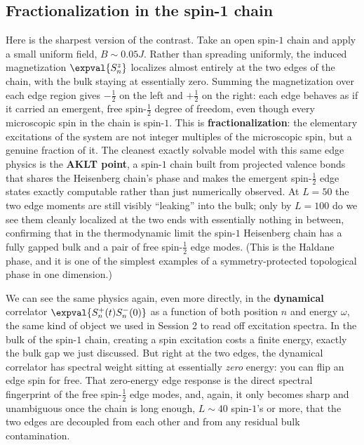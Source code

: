 \documentclass[all_sessions.tex]{subfiles}
\begin{document}
\subsection{Fractionalization in the spin-1 chain}
Here is the sharpest version of the contrast. Take an open spin-$1$ chain and apply a small
uniform field, $B\sim0.05J$. Rather than spreading uniformly, the induced magnetization
$\expval{S_n^z}$ localizes almost entirely at the two edges of the chain, with the bulk staying at
essentially zero. Summing the magnetization over each edge region gives $-\tfrac12$ on the left and
$+\tfrac12$ on the right: each edge behaves as if it carried an emergent, free spin-$\tfrac12$
degree of freedom, even though every microscopic spin in the chain is spin-$1$. This is
\textbf{fractionalization}: the elementary excitations of the system are not integer multiples of
the microscopic spin, but a genuine fraction of it. The cleanest exactly solvable model with this
same edge physics is the \textbf{AKLT point}, a spin-$1$ chain built from projected valence bonds
that shares the Heisenberg chain's phase and makes the emergent spin-$\tfrac12$ edge states exactly
computable rather than just numerically observed. At $L=50$ the two edge moments are still
visibly ``leaking'' into the bulk; only by $L=100$ do we see them cleanly localized at the two
ends with essentially nothing in between, confirming that in the thermodynamic limit the spin-$1$
Heisenberg chain has a fully gapped bulk and a pair of free spin-$\tfrac12$ edge modes. (This is
the Haldane phase, and it is one of the simplest examples of a symmetry-protected topological
phase in one dimension.)

We can see the same physics again, even more directly, in the \textbf{dynamical} correlator
$\expval{S_n^+(t)S_n^-(0)}$ as a function of both position $n$ and energy $\omega$, the same kind of
object we used in Session 2 to read off excitation spectra. In the bulk of the spin-$1$ chain,
creating a spin excitation costs a finite energy, exactly the bulk gap we just discussed. But right
at the two edges, the dynamical correlator has spectral weight sitting at essentially \emph{zero}
energy: you can flip an edge spin for free. That zero-energy edge response is the direct spectral
fingerprint of the free spin-$\tfrac12$ edge modes, and, again, it only becomes sharp and
unambiguous once the chain is long enough, $L\sim 40$ spin-$1$'s or more, that the two edges are
decoupled from each other and from any residual bulk contamination.
\end{document}

